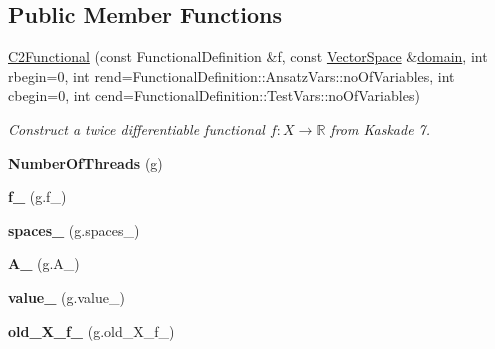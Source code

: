 \subsection*{\-Public \-Member \-Functions}
\begin{DoxyCompactItemize}
\item 
\hyperlink{classSpacy_1_1Kaskade_1_1C2Functional_a35511ed1de0b2599efa901f27793dbdc}{\-C2\-Functional} (const \-Functional\-Definition \&f, const \hyperlink{classSpacy_1_1VectorSpace}{\-Vector\-Space} \&\hyperlink{classSpacy_1_1FunctionalBase_a2d3397deb9fa1ad85ed04e37a03b3aa6}{domain}, int rbegin=0, int rend=\-Functional\-Definition\-::\-Ansatz\-Vars\-::no\-Of\-Variables, int cbegin=0, int cend=\-Functional\-Definition\-::\-Test\-Vars\-::no\-Of\-Variables)
\begin{DoxyCompactList}\small\item\em \-Construct a twice differentiable functional $f: X\rightarrow \mathbb{R}$ from \-Kaskade 7. \end{DoxyCompactList}\item 
\hypertarget{classSpacy_1_1Kaskade_1_1C2Functional_ac74a454a44bdb24c484ac21e5f510dcf}{{\bfseries \-Number\-Of\-Threads} (g)}\label{classSpacy_1_1Kaskade_1_1C2Functional_ac74a454a44bdb24c484ac21e5f510dcf}

\item 
\hypertarget{classSpacy_1_1Kaskade_1_1C2Functional_a5ba70db6e6ca12902f095b0d5de48749}{{\bfseries f\-\_\-} (g.\-f\-\_\-)}\label{classSpacy_1_1Kaskade_1_1C2Functional_a5ba70db6e6ca12902f095b0d5de48749}

\item 
\hypertarget{classSpacy_1_1Kaskade_1_1C2Functional_a3de900f8fac6e4e91be19d254586a1f6}{{\bfseries spaces\-\_\-} (g.\-spaces\-\_\-)}\label{classSpacy_1_1Kaskade_1_1C2Functional_a3de900f8fac6e4e91be19d254586a1f6}

\item 
\hypertarget{classSpacy_1_1Kaskade_1_1C2Functional_ae7ad8ac9409c2f593510f8a54c49783c}{{\bfseries \-A\-\_\-} (g.\-A\-\_\-)}\label{classSpacy_1_1Kaskade_1_1C2Functional_ae7ad8ac9409c2f593510f8a54c49783c}

\item 
\hypertarget{classSpacy_1_1Kaskade_1_1C2Functional_a49f95c673c4e7de34bf1c6c0198f6103}{{\bfseries value\-\_\-} (g.\-value\-\_\-)}\label{classSpacy_1_1Kaskade_1_1C2Functional_a49f95c673c4e7de34bf1c6c0198f6103}

\item 
\hypertarget{classSpacy_1_1Kaskade_1_1C2Functional_a234297689b87c5d511da1fb7d57b2980}{{\bfseries old\-\_\-\-X\-\_\-f\-\_\-} (g.\-old\-\_\-\-X\-\_\-f\-\_\-)}\label{classSpacy_1_1Kaskade_1_1C2Functional_a234297689b87c5d511da1fb7d57b2980}


\end{DoxyCompactItemize}
